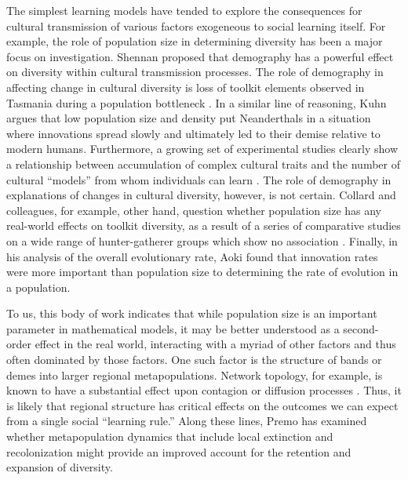 \documentclass[graybox,natbib]{svmult}
\begin{document}
The simplest learning models have tended to explore the consequences for
cultural transmission of various factors exogeneous to social learning
itself. For example, the role of population size in determining
diversity has been a major focus on investigation. Shennan
\citetext{\citeyear{shennan2000population}; \citeyear{shennan2001demography}}
proposed that demography has a powerful effect on diversity within
cultural transmission processes. The role of demography in affecting
change in cultural diversity is loss of toolkit elements observed in
Tasmania during a population bottleneck \citep{henrich2004}. In a
similar line of reasoning, Kuhn \citeyearpar{Kuhn2013Cultural-Transm}
argues that low population size and density put Neanderthals in a
situation where innovations spread slowly and ultimately led to their
demise relative to modern humans. Furthermore, a growing set of
experimental studies clearly show a relationship between accumulation of
complex cultural traits and the number of cultural ``models'' from whom
individuals can learn
\citep{muthukrishna2014sociality, derex2013experimental, kempe2014experimental}.
The role of demography in explanations of changes in cultural diversity,
however, is not certain. Collard and colleagues, for example, other
hand, question whether population size has any real-world effects on
toolkit diversity, as a result of a series of comparative studies on a
wide range of hunter-gatherer groups which show no association
\citep{collard2011drives, collard2013population, collard2013risk, collard2013plos}.
Finally, in his analysis of the overall evolutionary rate, Aoki
\citeyearpar{Aoki2013Determinants-of} found that innovation rates were
more important than population size to determining the rate of evolution
in a population.

To us, this body of work indicates that while population size is an
important parameter in mathematical models, it may be better understood
as a second-order effect in the real world, interacting with a myriad of
other factors and thus often dominated by those factors. One such factor
is the structure of bands or demes into larger regional metapopulations.
Network topology, for example, is known to have a substantial effect
upon contagion or diffusion processes
\citep[e.g.,][]{castellano2009statistical, smilkov2012influence}. Thus,
it is likely that regional structure has critical effects on the
outcomes we can expect from a single social ``learning rule.'' Along
these lines, Premo \citeyearpar{premo2012local} has examined whether
metapopulation dynamics that include local extinction and recolonization
might provide an improved account for the retention and expansion of
diversity.
\end{document}

